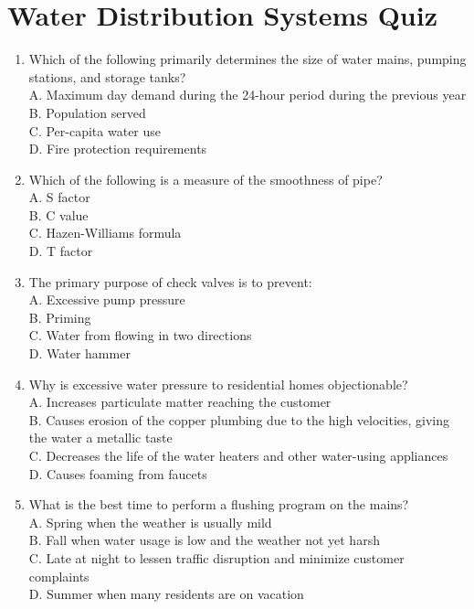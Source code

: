 \documentclass[10pt]{article}
\begin{document}
\section{Water Distribution Systems Quiz}
\begin{enumerate}
  \item Which of the following primarily determines the size of water mains, pumping stations, and storage tanks?\\
A. Maximum day demand during the 24-hour period during the previous year\\
B. Population served\\
C. Per-capita water use\\
D. Fire protection requirements

  \item Which of the following is a measure of the smoothness of pipe?\\
A. S factor\\
B. C value\\
C. Hazen-Williams formula\\
D. T factor

  \item The primary purpose of check valves is to prevent:\\
A. Excessive pump pressure\\
B. Priming\\
C. Water from flowing in two directions\\
D. Water hammer

  \item Why is excessive water pressure to residential homes objectionable?\\
A. Increases particulate matter reaching the customer\\
B. Causes erosion of the copper plumbing due to the high velocities, giving the water a metallic taste\\
C. Decreases the life of the water heaters and other water-using appliances\\
D. Causes foaming from faucets

  \item What is the best time to perform a flushing program on the mains?\\
A. Spring when the weather is usually mild\\
B. Fall when water usage is low and the weather not yet harsh\\
C. Late at night to lessen traffic disruption and minimize customer complaints\\
D. Summer when many residents are on vacation


\end{enumerate}
\end{document}
